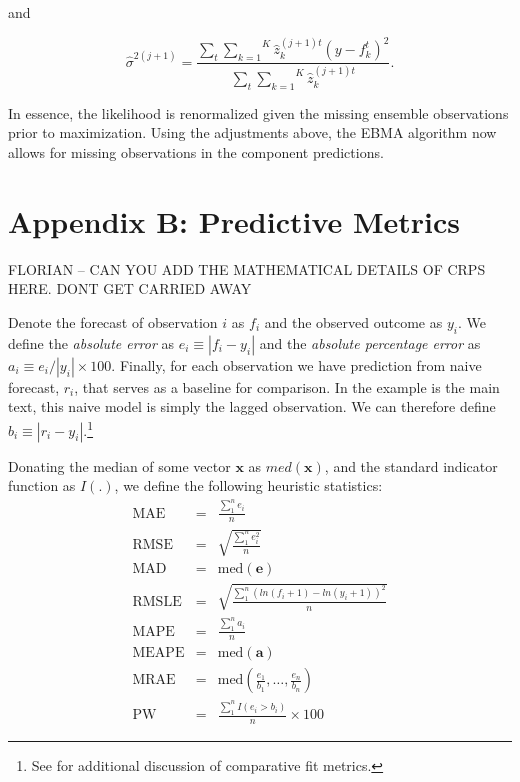 \documentclass[12pt,fullpage,endnotes]{article}
\begin{document}
\noindent and

\begin{equation}
\hat{\sigma}^{2(j+1)}=\frac{\underset{t}{\sum}\overset{K}{\underset{k=1}{\sum}}\hat{z}^{(j+1)t}_{k}(y-f_{k}^{t})^2 }{\underset{t}{\sum}\overset{K}{\underset{k=1}{ \sum}} \hat{z}_k^{(j+1)t}}.
\end{equation}

\noindent In essence, the likelihood is renormalized given the missing
ensemble observations prior to maximization. Using the adjustments
above, the EBMA algorithm now allows for missing observations in the
component predictions.



 \section*{Appendix B: Predictive Metrics}

FLORIAN -- CAN YOU ADD THE MATHEMATICAL DETAILS OF CRPS HERE.  DONT GET CARRIED AWAY


 Denote the forecast of observation $i$ as $f_i$ and the observed
 outcome as $y_i$.  We define the \textit{absolute error} as
 $e_i\equiv |f_i - y_i|$ and the \textit{absolute percentage error} as
 $a_i \equiv e_i / |y_i| \times 100$.  Finally, for each observation we have
 prediction from naive forecast, $r_i$, that serves as a baseline for
 comparison.  In the example is the main text, this naive model is
 simply the lagged observation.  We can therefore define $b_i \equiv
 |r_i - y_i|$.\footnote{See \citet{brandt:freeman:schrodt:2011} for
   additional discussion of comparative fit metrics.}

 Donating the median of some vector $\mathbf{x}$ as $med(\mathbf{x})$,
 and the standard indicator function as $I(.)$, we define the following heuristic statistics:
 \begin{eqnarray*}
 \mathrm{MAE} &=& \frac{\sum_1^n{e_i}}{n}\\
  \mathrm{RMSE} &=& \sqrt{\frac{\sum_1^n{e^2_i}}{n}} \\
  \mathrm{MAD} &=& \mathrm{med}(\mathbf{e}) \\
  \mathrm{RMSLE} &=& \sqrt{\frac{\sum_1^n\left(ln(f_i+1) - ln(y_i+1)  \right)^2}{n}} \\
  \mathrm{MAPE} &=& \frac{\sum_1^n{a_i}}{n} \\
   \mathrm{MEAPE} &=& \mathrm{med}(\mathbf{a}) \\
 \mathrm{MRAE} &=& \mathrm{med}\left(\frac{e_1}{b_1}, \ldots, \frac{e_n}{b_n} \right) \\
 \mathrm{PW} &=& \frac{\sum_1^nI(e_i > b_i)}{n} \times 100
\end{eqnarray*}
\end{document}
